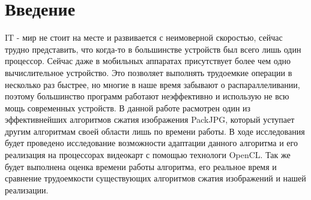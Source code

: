 \documentclass{matmex-diploma-custom}
\begin{document}
\maketitle
\tableofcontents
\newpage
\section*{Введение}
IT - мир не стоит на  месте и развивается с неимоверной скоростью, сейчас трудно представить, что когда-то
в большинстве устройств был всего лишь один процессор. Сейчас даже в мобильных
аппаратах присутствует более чем одно вычислительное устройство.
Это позволяет выполнять трудоемкие операции в несколько раз быстрее,
но многие в наше время забывают о распараллеливании, поэтому большинство программ работают
неэффективно и использую не всю мощь современных устройств.
В данной работе расмотрен один из эффективнейших алгоритмов сжатия изображения PackJPG,
который уступает другим алгоритмам своей области лишь по времени работы.
В ходе исследования будет проведено исследование возможности адаптации данного алгоритма и его реализация на
процессорах видеокарт с помощью технологи OpenCL.
Так же будет выполнена оценка времени работы алгоритма, его реальное время и сравнение
трудоемкости существующих алгоритмов сжатия изображений и  нашей реализации.
\end{document}
